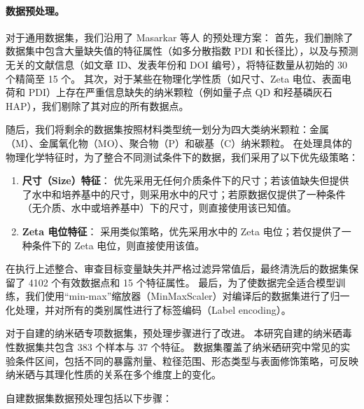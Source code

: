 \paragraph{数据预处理。}
对于通用数据集，我们沿用了 Masarkar 等人 \cite{masarkar2024} 的预处理方案：
首先，我们删除了数据集中包含大量缺失值的特征属性（如多分散指数 PDI 和长径比），以及与预测无关的文献信息（如文章 ID、发表年份和 DOI 编号），将特征数量从初始的 30 个精简至 15 个。
其次，对于某些在物理化学性质（如尺寸、Zeta 电位、表面电荷和 PDI）上存在严重信息缺失的纳米颗粒（例如量子点 QD 和羟基磷灰石 HAP），我们剔除了其对应的所有数据点。

随后，我们将剩余的数据集按照材料类型统一划分为四大类纳米颗粒：金属（M）、金属氧化物（MO）、聚合物（P）和碳基（C）纳米颗粒。
在处理具体的物理化学特征时，为了整合不同测试条件下的数据，我们采用了以下优先级策略：

\begin{enumerate}
  \item \textbf{尺寸（Size）特征}：
优先采用无任何介质条件下的尺寸；若该值缺失但提供了水中和培养基中的尺寸，则采用水中的尺寸；若原数据仅提供了一种条件（无介质、水中或培养基中）下的尺寸，则直接使用该已知值。

  \item \textbf{Zeta 电位特征}：
采用类似策略，优先采用水中的 Zeta 电位；若仅提供了一种条件下的 Zeta 电位，则直接使用该值。
\end{enumerate}

在执行上述整合、审查目标变量缺失并严格过滤异常值后，最终清洗后的数据集保留了 4102 个有效数据点和 15 个特征属性。
最后，为了使数据完全适合模型训练，我们使用“min-max”缩放器（MinMaxScaler）对编译后的数据集进行了归一化处理，并对所有的类别属性进行了标签编码（Label encoding）。

对于自建的纳米硒专项数据集，预处理步骤进行了改进。
本研究自建的纳米硒毒性数据集共包含 383 个样本与 37 个特征。
数据集覆盖了纳米硒研究中常见的实验条件区间，包括不同的暴露剂量、粒径范围、形态类型与表面修饰策略，可反映纳米硒与其理化性质的关系在多个维度上的变化。

自建数据集数据预处理包括以下步骤：

